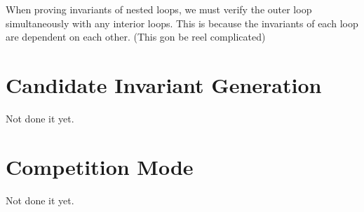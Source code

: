 \documentclass[11pt]{article}
\begin{document}
When proving invariants of nested loops, we must verify the outer loop simultaneously with any interior loops. This
is because the invariants of each loop are dependent on each other. (This gon be reel complicated)

\section{Candidate Invariant Generation}
Not done it yet.
\section{Competition Mode}
Not done it yet.
\end{document}
